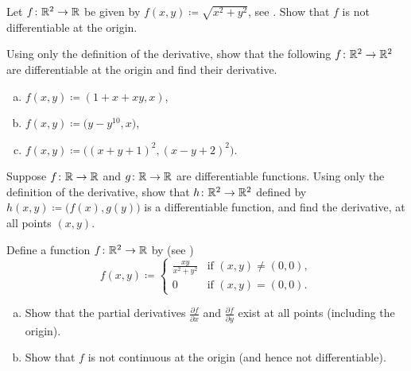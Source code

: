 \begin{exercise}
Let $f \colon {\mathbb{R}}^2 \to {\mathbb{R}}$ be given by
$f(x,y)
\coloneqq
\sqrt{x^2+y^2}$,
see .
Show that $f$ is not differentiable at the origin.
\end{exercise}

\begin{myfigureht}
\caption{Graph of $\sqrt{x^2+y^2}$.\label{fig:distfromorgfunc}}
\end{myfigureht}

\begin{samepage}
\begin{exercise}
Using only the definition of the derivative, show that
the following $f \colon {\mathbb{R}}^2 \to {\mathbb{R}}^2$ are differentiable at the origin and
find their derivative.
\begin{enumerate}[a)]
\item
$f(x,y) \coloneqq (1+x+xy,x)$,
\item
$f(x,y) \coloneqq \bigl(y-y^{10},x \bigr)$,
\item
$f(x,y) \coloneqq \bigl( {(x+y+1)}^2 , {(x-y+2)}^2 \bigr)$.
\end{enumerate}
\end{exercise}
\end{samepage}

\begin{exercise}
Suppose $f \colon {\mathbb{R}} \to {\mathbb{R}}$ and $g \colon {\mathbb{R}} \to {\mathbb{R}}$ are differentiable
functions.  Using only the definition of the derivative, show that
$h \colon {\mathbb{R}}^2 \to {\mathbb{R}}^2$ defined by $h(x,y)
\coloneqq \bigl(f(x),g(y)\bigr)$ is a differentiable function, and find the
derivative, at all points $(x,y)$.
\end{exercise}

\begin{exercise} \label{exercise:noncontpartialsexist}
Define a function $f \colon {\mathbb{R}}^2 \to {\mathbb{R}}$ by
(see )
\begin{equation*}
f(x,y)
\coloneqq
\begin{cases}
\frac{xy}{x^2+y^2} & \text{if } (x,y) \neq (0,0), \\
0                  & \text{if } (x,y) = (0,0).
\end{cases}
\end{equation*}
\begin{enumerate}[a)]
\item
Show that the partial derivatives 
$\frac{\partial f}{\partial x}$ and
$\frac{\partial f}{\partial y}$ exist at all points (including the origin).
\item
Show that $f$ is not continuous at the origin (and hence not
differentiable).
\end{enumerate}
\end{exercise}

